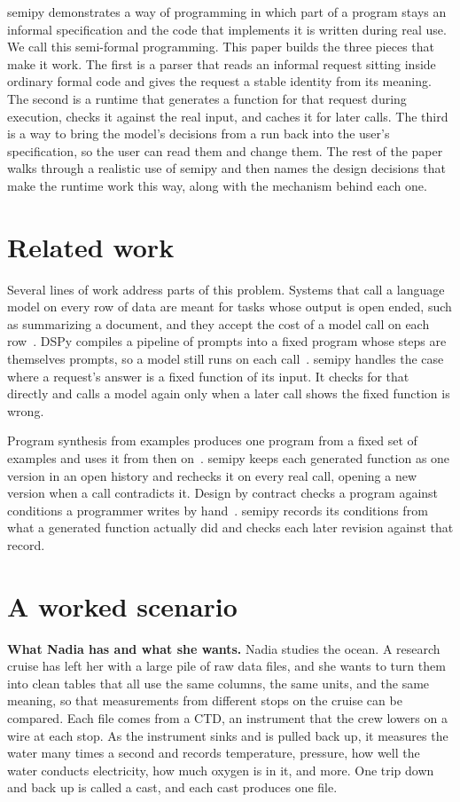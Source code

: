 \documentclass[9pt]{extarticle}
\begin{document}
semipy demonstrates a way of programming in which part of a program stays an
informal specification and the code that implements it is written during real
use. We call this semi-formal programming. This paper builds the three pieces
that make it work. The first is a parser that reads an informal request
sitting inside ordinary formal code and gives the request a stable identity
from its meaning. The second is a runtime that generates a function for that
request during execution, checks it against the real input, and caches it for
later calls. The third is a way to bring the model's decisions from a run back
into the user's specification, so the user can read them and change them. The
rest of the paper walks through a realistic use of semipy and then names the
design decisions that make the runtime work this way, along with the mechanism
behind each one.

\section{Related work}

Several lines of work address parts of this problem. Systems that call a
language model on every row of data are meant for tasks whose output is open
ended, such as summarizing a document, and they accept the cost of a model
call on each row~\cite{docetl,palimpzest}. DSPy compiles a pipeline of prompts
into a fixed program whose steps are themselves prompts, so a model still runs
on each call~\cite{dspy}. semipy handles the case where a request's answer is a
fixed function of its input. It checks for that directly and calls a model
again only when a later call shows the fixed function is wrong.

Program synthesis from examples produces one program from a fixed set of
examples and uses it from then on~\cite{gulwani11}. semipy keeps each
generated function as one version in an open history and rechecks it on every
real call, opening a new version when a call contradicts it. Design by
contract checks a program against conditions a programmer writes by
hand~\cite{meyer97}. semipy records its conditions from what a generated
function actually did and checks each later revision against that record.

\section{A worked scenario}
\label{sec:scenario}

\textbf{What Nadia has and what she wants.} Nadia studies the ocean. A
research cruise has left her with a large pile of raw data files, and she
wants to turn them into clean tables that all use the same columns, the same
units, and the same meaning, so that measurements from different stops on the
cruise can be compared. Each file comes from a CTD, an instrument that the
crew lowers on a wire at each stop. As the instrument sinks and is pulled back
up, it measures the water many times a second and records temperature,
pressure, how well the water conducts electricity, how much oxygen is in it,
and more. One trip down and back up is called a cast, and each cast produces
one file.
\end{document}
